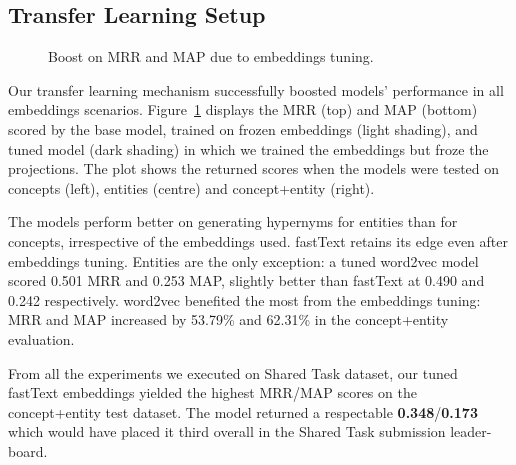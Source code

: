 \subsection{Transfer Learning Setup}
\begin{figure}[!ht]
    \centering
    \qquad
    \caption{Boost on \ac{MRR} and \ac{MAP} due to embeddings tuning.}        
    \label{fig:embeddings_boost}
\end{figure}
Our transfer learning mechanism successfully boosted models' performance in all embeddings scenarios.  Figure~\ref{fig:embeddings_boost} displays the \ac{MRR} (top) and \ac{MAP} (bottom) scored by the base model, trained on frozen embeddings (light shading), and tuned model (dark shading) in which we trained the embeddings but froze the projections.  The plot shows the returned scores when the models were tested on concepts (left), entities (centre) and concept+entity (right).

The models perform better on generating hypernyms for entities than for concepts, irrespective of the embeddings used.  fastText retains its edge even after embeddings tuning.  Entities are the only exception: a tuned word2vec model scored 0.501 \ac{MRR} and 0.253 \ac{MAP}, slightly better than fastText at 0.490 and 0.242 respectively.  word2vec benefited the most from the embeddings tuning: \ac{MRR} and \ac{MAP} increased by 53.79\% and 62.31\% in the concept+entity evaluation. 

From all the experiments we executed on Shared Task dataset, our tuned fastText embeddings yielded the highest MRR/MAP scores on the concept+entity test dataset.  The model returned a respectable \textbf{0.348}/\textbf{0.173} which would have placed it third overall in the Shared Task submission leader-board.